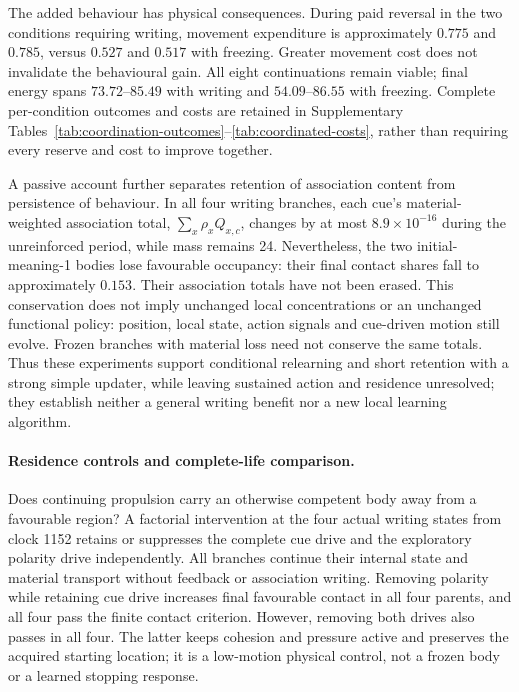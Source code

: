 

The added behaviour has physical consequences. During paid reversal in the two conditions requiring writing, movement expenditure is approximately $0.775$ and $0.785$, versus $0.527$ and $0.517$ with freezing. Greater movement cost does not invalidate the behavioural gain. All eight continuations remain viable; final energy spans $73.72$--$85.49$ with writing and $54.09$--$86.55$ with freezing. Complete per-condition outcomes and costs are retained in Supplementary Tables~\ref{tab:coordination-outcomes}--\ref{tab:coordinated-costs}, rather than requiring every reserve and cost to improve together.

A passive account further separates retention of association content from persistence of behaviour. In all four writing branches, each cue's material-weighted association total, $\sum_x\rho_x Q_{x,c}$, changes by at most $8.9\times10^{-16}$ during the unreinforced period, while mass remains 24. Nevertheless, the two initial-meaning-1 bodies lose favourable occupancy: their final contact shares fall to approximately $0.153$. Their association totals have not been erased. This conservation does not imply unchanged local concentrations or an unchanged functional policy: position, local state, action signals and cue-driven motion still evolve. Frozen branches with material loss need not conserve the same totals. Thus these experiments support conditional relearning and short retention with a strong simple updater, while leaving sustained action and residence unresolved; they establish neither a general writing benefit nor a new local learning algorithm.

\paragraph{Residence controls and complete-life comparison.}

Does continuing propulsion carry an otherwise competent body away from a favourable region? A factorial intervention at the four actual writing states from clock 1152 retains or suppresses the complete cue drive and the exploratory polarity drive independently. All branches continue their internal state and material transport without feedback or association writing. Removing polarity while retaining cue drive increases final favourable contact in all four parents, and all four pass the finite contact criterion. However, removing both drives also passes in all four. The latter keeps cohesion and pressure active and preserves the acquired starting location; it is a low-motion physical control, not a frozen body or a learned stopping response.

